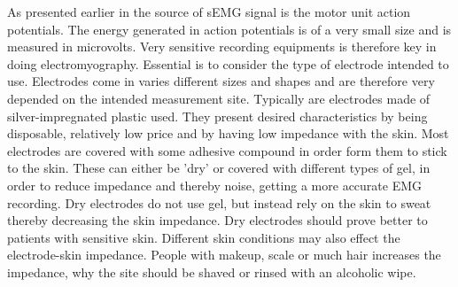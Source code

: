 



As presented earlier in  the source of sEMG signal is the motor unit action potentials. The energy generated in action potentials is of a very small size and is measured in microvolts. Very sensitive recording equipments is therefore key in doing electromyography. Essential is to consider the type of electrode intended to use. Electrodes come in varies different sizes and shapes and are therefore very depended on the intended measurement site. Typically are electrodes made of silver-impregnated plastic used. They present desired characteristics by being disposable, relatively low price and by having low impedance with the skin. Most electrodes are covered with some adhesive compound in order form them to stick to the skin. These can either be 'dry' or covered with different types of gel, in order to reduce impedance and thereby noise, getting a more accurate EMG recording. Dry electrodes do not use gel, but instead rely on the skin to sweat thereby decreasing the skin impedance. Dry electrodes should prove better to patients with sensitive skin. Different skin conditions may also effect the electrode-skin impedance. People with makeup, scale or much hair increases the impedance, why the site should be shaved or rinsed with an alcoholic wipe.\cite{Cram2012}   




 


